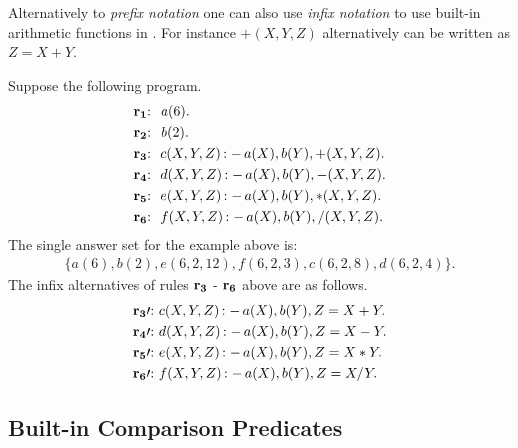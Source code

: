 \documentclass[a4paper, titlepage]{article}
\DeclareMathOperator{\leftimpl}{:-}
\newcommand{\row}[1]{%
  \ensuremath{\color{black}\ensuremath{\mathbf{#1}} \color{black}}%
}
\newcommand{\rowprefix}[1]{%
  \ensuremath{\color{black}\mathbf{#1{:}}\ }%
}
\newcommand{\rowprefixprime}[1]{%
  \ensuremath{\color{black}\mathbf{#1\prime{:}}\ }%
}
\begin{document}
Alternatively to \emph{prefix notation} one can also use 
\emph{infix notation} to use built-in arithmetic functions 
in \dlvhex{}. For instance $\mathit{+(X, Y, Z)}$ 
alternatively can be written as $\mathit{Z=X+Y}$. 

\begin{exmp}
Suppose the following program.
\begin{align*}
&\rowprefix{r_1} \ \mathit{a}(6). \\
&\rowprefix{r_2} \ \mathit{b}(2). \\
&\rowprefix{r_3} \ c(X,Y,Z) \leftimpl a(X), b(Y),+(X, Y, Z). \\
&\rowprefix{r_4}  \ d(X,Y,Z) \leftimpl a(X), b(Y),-(X, Y, Z). \\
&\rowprefix{r_5} \ e(X,Y,Z) \leftimpl a(X), b(Y),*(X, Y, Z). \\
&\rowprefix{r_6} \ f(X,Y,Z) \leftimpl a(X), b(Y),/(X, Y, Z).
\end{align*}
The single answer set for the example above is:
\begin{align*}
\{a(6),b(2),e(6,2,12),f(6,2,3),c(6,2,8),d(6,2,4)\}.
\end{align*}
The infix alternatives of rules \row{r_3}-\row{r_6} above are as follows.
\begin{align*}
&\rowprefixprime{r_3} c(X,Y,Z) \leftimpl a(X), b(Y),Z=X+Y. \\
&\rowprefixprime{r_4} d(X,Y,Z) \leftimpl a(X), b(Y),Z=X-Y. \\
&\rowprefixprime{r_5} e(X,Y,Z) \leftimpl a(X), b(Y),Z=X*Y. \\
&\rowprefixprime{r_6} f(X,Y,Z) \leftimpl a(X), b(Y),Z=X/Y.
\end{align*}
\end{exmp}

\subsection{Built-in Comparison Predicates}
\end{document}
